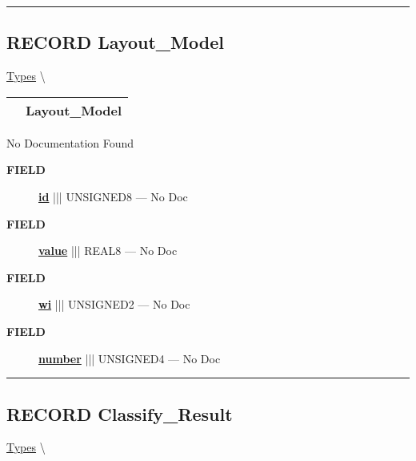 \rule{\linewidth}{0.5pt}
\subsection*{\textsf{\colorbox{headtoc}{\color{white} RECORD}
Layout\_Model}}

\hypertarget{ecldoc:ml_core.types.layout_model}{}
\hspace{0pt} \hyperlink{ecldoc:ML_Core.Types}{Types} \textbackslash 

{\renewcommand{\arraystretch}{1.5}
\begin{tabularx}{\textwidth}{|>{\raggedright\arraybackslash}l|X|}
\hline
\hspace{0pt}\mytexttt{\color{red} } & \textbf{Layout\_Model} \\
\hline
\end{tabularx}
}

\par





No Documentation Found







\par
\begin{description}
\item [\colorbox{tagtype}{\color{white} \textbf{\textsf{FIELD}}}] \textbf{\underline{id}} ||| UNSIGNED8 --- No Doc
\item [\colorbox{tagtype}{\color{white} \textbf{\textsf{FIELD}}}] \textbf{\underline{value}} ||| REAL8 --- No Doc
\item [\colorbox{tagtype}{\color{white} \textbf{\textsf{FIELD}}}] \textbf{\underline{wi}} ||| UNSIGNED2 --- No Doc
\item [\colorbox{tagtype}{\color{white} \textbf{\textsf{FIELD}}}] \textbf{\underline{number}} ||| UNSIGNED4 --- No Doc
\end{description}





\rule{\linewidth}{0.5pt}
\subsection*{\textsf{\colorbox{headtoc}{\color{white} RECORD}
Classify\_Result}}

\hypertarget{ecldoc:ml_core.types.classify_result}{}
\hspace{0pt} \hyperlink{ecldoc:ML_Core.Types}{Types} \textbackslash 

